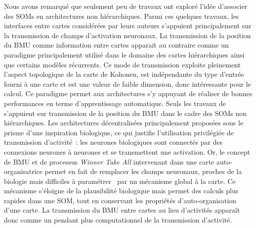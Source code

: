 \documentclass[../main]{subfiles}
\begin{document}
Nous avons remarqué que seulement peu de travaux ont exploré l'idée d'associer des SOMs en architectures non hiérarchiques.
Parmi ces quelques travaux, les interfaces entre cartes considérées par leurs auteurs s'appuient principalement sur la transmission de champs d'activation neuronaux.
La transmission de la position du BMU comme information entre cartes apparait au contraire comme un paradigme principalement utilisé dans le domaine des cartes hiérarchiques ainsi que certains modèles récurrents.
Ce mode de transmission exploite pleinement l'aspect topologique de la carte de Kohonen, est indépendante du type d'entrée fourni à une carte et est une valeur de faible dimension, donc intéressante pour le calcul. Ce paradigme permet aux architectures s'y appuyant de réaliser de bonnes performances en terme d'apprentissage automatique.
Seuls les travaux de \cite{dominey13} s'appuient sur transmission de la position du BMU dans le cadre des SOMs non hiérarchiques.
Les architectures décentralisées principalement proposées sous le prisme d'une inspiration biologique, ce qui justifie l'utilisation privilégiée de transmission d'activité~: les neurones biologiques sont connectés par des connexions neurones à neurones et se transmettent une activation. 
Or, le concept de BMU et de processus \emph{Winner Take All} intervenant dans une carte auto-organisatrice permet en fait de remplacer les champs neuronaux, proches de la biologie mais difficiles à paramétrer~\parencite{fix:hal-00869726} par un mécanisme global à la carte. Ce mécanisme s'éloigne de la plausibilité biologique mais permet des calculs plus rapides dans une SOM, tout en conservant les propriétés d'auto-organisation d'une carte. La transmission du BMU entre cartes au lieu d'activités apparaît donc comme un pendant plus computationnel de la transmission d'activité.
\end{document}
